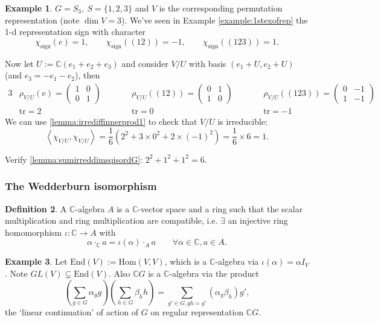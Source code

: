\documentclass[a4paper]{article}
\newcommand{\tr}{\text{tr}}
\newcommand{\la}{\left\langle}
\newcommand{\ra}{\right\rangle}
\newcommand{\C}{\mathbb{C}}
\newcommand{\End}{\text{End}}
\newcommand{\Hom}{\text{Hom}}
\theoremstyle{definition}
\newtheorem{defn}{Definition}[subsection]
\newtheorem{example}[defn]{Example}
\begin{document}
\begin{example}
$G=S_3,\ S=\{1,2,3\}$ and $V$ is the corresponding permutation representation (note $\dim V=3$). We've seen in Example \ref{example:1stexofrep} the 1-d representation sign with character
\[
\chi_{\text{sign}}(e)=1,\qquad \chi_{\text{sign}}((12))=-1,\qquad \chi_{\text{sign}}((123))=1.
\]

Now let $U:=\C(e_1+e_2+e_3)$ and consider $V/U$ with basis $(e_1+U,e_2+U)$ (and $e_3=-e_1-e_2$), then
\begin{alignat*}{3}
&\rho_{V/U}(e)=\begin{pmatrix}1&0\\0&1\end{pmatrix}\qquad &&\rho_{V/U}((12))=\begin{pmatrix}0&1\\1&0\end{pmatrix}\qquad&&\rho_{V/U}((123))=\begin{pmatrix}0&-1\\1&-1\end{pmatrix}\\
&\tr=2 &&\tr=0 &&\tr=-1
\end{alignat*}
We can use \ref{lemma:irrediffinnerprod1} to check that $V/U$ is irreducible:
\[
\la\chi_{V/U},\chi_{V/U}\ra=\frac16\left(2^2+3\times 0^2+2\times(-1)^2\right)=\frac16\times 6=1.
\]

Verify \ref{lemma:sumirreddimsqisordG}: $2^2+1^2+1^2=6.$
\end{example}

\subsubsection{The Wedderburn isomorphism}
\begin{defn}
A $\C$-algebra $A$ is a $\C$-vector space and a ring such that the scalar multiplication and ring multiplication are compatible, i.e. $\exists$ an injective ring homomorphism $\iota:\C\rightarrow A$ with
\[
\alpha\cdot_\C a=\iota(\alpha)\cdot_A a \qquad \forall \alpha\in\C,a\in A.
\]
\end{defn}

\begin{example}
Let $\End(V):=\Hom(V,V)$, which is a $\C$-algebra via $\iota(\alpha)=\alpha I_V$. Note $GL(V)\subsetneq \End(V)$. Also $\C G$ is a $\C$-algebra via the product
\[
\left(\sum_{g\in G}\alpha_g g\right)\left(\sum_{h\in G}\beta_h h\right)=\sum_{g'\in G,gh=g'}(\alpha_g\beta_h)g',
\]
the `linear continuation' of action of $G$ on regular representation $\C G$.
\end{example}
\end{document}
